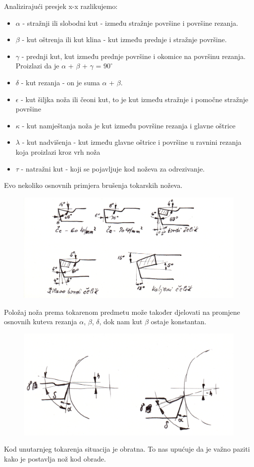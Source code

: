 \documentclass[a4paper,12pt]{article}
\numberwithin{figure}{section}
\begin{document}
\FloatBarrier
Analizirajući presjek x-x razlikujemo:
\begin{itemize}
\item $\alpha$ - stražnji ili slobodni kut - između stražnje površine i površine rezanja. 
\item $\beta$ - kut oštrenja ili kut klina - kut između prednje i stražnje površine.
\item $\gamma$ - prednji kut, kut između prednje površine i okomice na površinu rezanja. Proizlazi da je $\alpha$ + $\beta$ + $\gamma$ = $90^{\circ}$
\item $\delta$ - kut rezanja - on je suma $\alpha$ + $\beta$.
\item $\epsilon$ - kut šiljka noža ili čeoni kut, to je kut između stražnje i pomočne stražnje površine
\item $\kappa$ - kut namještanja noža je kut između površine rezanja i glavne oštrice
\item $\lambda$ - kut nadvišenja - kut između glavne oštrice i površine u ravnini rezanja koja proizlazi kroz vrh noža
\item $\tau$ - natražni kut - koji se pojavljuje kod noževa za odrezivanje.
\end{itemize}
Evo nekoliko osnovnih primjera brušenja tokarskih noževa.
\begin{figure}[!h]
\includegraphics[width=\textwidth]{image_03.png}
\end{figure}
\FloatBarrier
Položaj noža prema tokarenom predmetu može također djelovati na promjene osnovnih kuteva rezanja $\alpha$, $\beta$, $\delta$, dok nam kut $\beta$ ostaje konstantan.
\begin{figure}[!h]
\includegraphics[width=\textwidth]{image_04.png}
\end{figure}
\FloatBarrier
Kod unutarnjeg tokarenja situacija je obratna. To nas upućuje da je važno paziti kako je postavlja nož kod obrade. 
\end{document}
